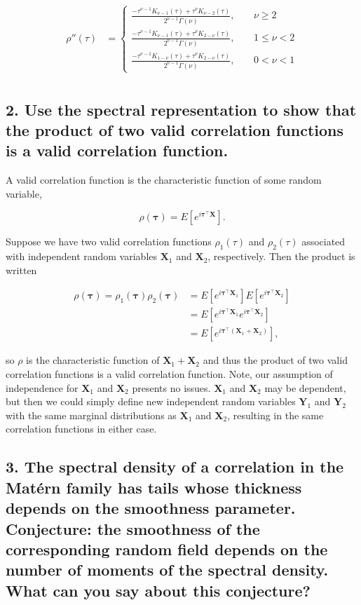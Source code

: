 \documentclass[12pt]{article}
\newcommand{\m}[1]{\mathbf{\bm{#1}}}
\begin{document}
\begin{align*}
\rho''(\tau) &= \begin{cases} \frac{-\tau^{\nu-1} K_{\nu-1}(\tau)+\tau^\nu K_{\nu-2}(\tau)}{2^{\nu-1}\Gamma(\nu)},~~~~~ &\nu\geq2 \\
  \frac{-\tau^{\nu-1} K_{\nu-1}(\tau)+\tau^\nu K_{2-\nu}(\tau)}{2^{\nu-1}\Gamma(\nu)},~~~~~ &1\leq\nu<2 \\
  \frac{-\tau^{\nu-1} K_{1-\nu}(\tau)+\tau^\nu K_{2-\nu}(\tau)}{2^{\nu-1}\Gamma(\nu)},~~~~~ &0<\nu<1 
\end{cases} \\
\end{align*}


\subsection*{2. Use the spectral representation to show that the product of two valid correlation functions is a valid correlation function.}

A valid correlation function is the characteristic function of some random variable,

\[ \rho(\m{\tau}) = E\left[e^{i\m{\tau}^\top\m{X}}\right]. \]

Suppose we have two valid correlation functions $\rho_1(\tau)$ and $\rho_2(\tau)$ associated with independent random variables $\m{X}_1$ and $\m{X}_2$, respectively. Then the product is written

\begin{align*}
\rho(\m{\tau}) = \rho_1(\m{\tau})\rho_2(\m{\tau}) &= E\left[e^{i\m{\tau}^\top\m{X}_1}\right]E\left[e^{i\m{\tau}^\top\m{X}_2}\right] \\
 &= E\left[e^{i\m{\tau}^\top\m{X}_1}e^{i\m{\tau}^\top\m{X}_2}\right] \\
 &= E\left[e^{i\m{\tau}^\top(\m{X}_1+\m{X}_2)}\right], 
\end{align*}

so $\rho$ is the characteristic function of $\m{X}_1+\m{X}_2$ and thus the product of two valid correlation functions is a valid correlation function. Note, our assumption of independence for $\m{X}_1$ and $\m{X}_2$ presents no issues. $\m{X}_1$ and $\m{X}_2$ may be dependent, but then we could simply define new independent random variables $\m{Y}_1$ and $\m{Y}_2$ with the same marginal distributions as $\m{X}_1$ and $\m{X}_2$, resulting in the same correlation functions in either case.

\subsection*{3. The spectral density of a correlation in the Mat{\'e}rn family has tails whose thickness depends on the smoothness parameter. Conjecture: the smoothness of the corresponding random field depends on the number of moments of the spectral density. What can you say about this conjecture?}
\end{document}
